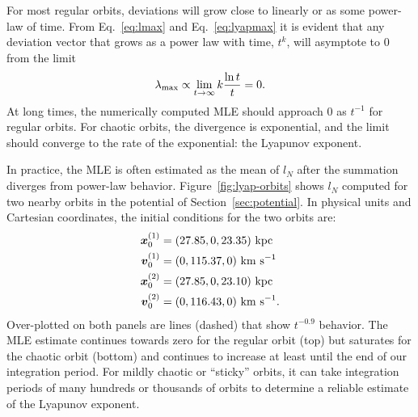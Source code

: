 \documentclass[letterpaper,12pt,preprint]{aastex}
\newcommand{\bs}[1]{\boldsymbol{#1}}
\begin{document}
For most regular orbits, deviations will grow close to linearly or as some power-law of time. 
From Eq.~\ref{eq:lmax} and Eq.~\ref{eq:lyapmax} it is evident that any deviation vector that grows as a power law with time, $t^k$, will asymptote to 0 from the limit 
\begin{equation}
	\lambda_{\rm max} \propto \lim_{t\rightarrow \infty} k \frac{\ln t}{t} = 0.
\end{equation}
At long times, the numerically computed MLE should approach 0 as $t^{-1}$ for regular orbits. For chaotic orbits, the divergence is exponential, and the limit should converge to the rate of the exponential: the Lyapunov exponent.

In practice, the MLE is often estimated as the mean of $l_N$ after the summation diverges from power-law behavior. Figure~\ref{fig:lyap-orbits} shows $l_N$ computed for two nearby orbits in the potential of Section~\ref{sec:potential}. In physical units and Cartesian coordinates, the initial conditions for the two orbits are:
\begin{align}
	\bs{x}_{0}^{(1)} &= (27.85, 0, 23.35)~{\rm kpc}\\
	\bs{v}_{0}^{(1)} &= (0, 115.37, 0)~{\rm km~s}^{-1}\\
	\bs{x}_{0}^{(2)} &= (27.85, 0, 23.10)~{\rm kpc}\\
	\bs{v}_{0}^{(2)} &= (0, 116.43, 0)~{\rm km~s}^{-1}.
\end{align}
Over-plotted on both panels are lines (dashed) that show $t^{-0.9}$ behavior. The MLE estimate continues towards zero for the regular orbit (top) but saturates for the chaotic orbit (bottom) and continues to increase at least until the end of our integration period. For mildly chaotic or ``sticky'' orbits, it can take integration periods of many hundreds or thousands of orbits to determine a reliable estimate of the Lyapunov exponent.
\end{document}

